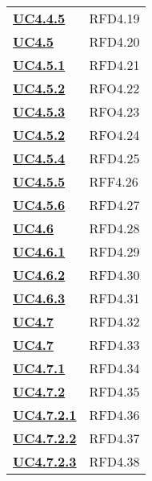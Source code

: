 \begin{longtable}[H]{| >{\centering\bfseries}p{8cm} | >{\centering\arraybackslash}p{8cm} |}
    \hyperref[par:uc4.4.5]{UC4.4.5} & RFD4.19 \\

    \hyperref[ssub:uc4.5]{UC4.5} & RFD4.20 \\

    \hyperref[par:uc4.5.1]{UC4.5.1}  & RFD4.21 \\

    \hyperref[par:uc4.5.2]{UC4.5.2} & RFO4.22 \\

    \hyperref[par:uc4.5.3]{UC4.5.3} & RFO4.23 \\

    \hyperref[par:uc4.5.2]{UC4.5.2} & RFO4.24 \\

    \hyperref[par:uc4.5.4]{UC4.5.4} & RFD4.25 \\

    \hyperref[par:uc4.5.5]{UC4.5.5} & RFF4.26 \\

    \hyperref[par:uc4.5.6]{UC4.5.6} & RFD4.27 \\

    \hyperref[par:uc4.6.1]{UC4.6} & RFD4.28 \\

    \hyperref[par:uc4.6.1]{UC4.6.1} & RFD4.29 \\

    \hyperref[par:uc4.6.2]{UC4.6.2} & RFD4.30 \\

    \hyperref[par:uc4.6.3]{UC4.6.3} & RFD4.31 \\

    \hyperref[ssub:uc4.7]{UC4.7} & RFD4.32 \\

    \hyperref[ssub:uc4.7]{UC4.7} & RFD4.33 \\

    \hyperref[par:uc4.7.1]{UC4.7.1} & RFD4.34 \\

    \hyperref[par:uc4.7.2]{UC4.7.2} & RFD4.35 \\

    \hyperref[spar:uc4.7.2.1]{UC4.7.2.1} & RFD4.36 \\

    \hyperref[spar:uc4.7.2.2]{UC4.7.2.2} & RFD4.37 \\

    \hyperref[spar:uc4.7.2.3]{UC4.7.2.3} & RFD4.38 \\


\end{longtable}
